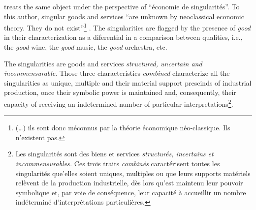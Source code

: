 \documentclass[a4paper, 12pt, openright, oneside, german, french, brazil, english, article]{abntex2}
\begin{document}
	\cite{karpik2009elements} treats the same object under the perspective of ``économie de singularités''. To this author, singular goods and services ``are unknown by neoclassical economic theory. They do not exist''\footnote{(\dots) ils sont donc méconnus par la théorie économique néo-classique. Ils n'existent pas.} \cite[p. 163]{karpik2009elements}. The singularities are flagged by the presence of \textit{good} in their characterization as a diferential in a comparison between qualities, i.e., the \textit{good} wine, the \textit{good} music, the \textit{good} orchestra, etc. 
	
	
	\begin{citacao}
		The singularities are goods and services \textit{structured, uncertain and incommensurable}. Those three characteristics \textit{combined} characterize all the singularities as unique, multiple and their material support prescinds of industrial production, once their symbolic power is maintained and, consequently, their capacity of receiving an indetermined number of particular interpretations\footnote{Les singularités sont des biens et services \textit{structurés, incertains et incommensurables.} Ces trois traits \textit{combinés} caractérisent toutes les singularités que'elles soient uniques, multiples ou que leurs supports matériels relèvent de la production industrielle, dès lors qu'est maintenu leur pouvoir symbolique et, par voie de conséquence, leur capacité à accueillir un nombre indéterminé d'interprétations particulières.}. \cite[p. 164]{karpik2009elements}
	\end{citacao}
	
	
\end{document}

